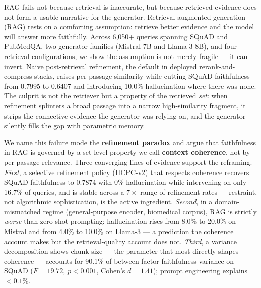 RAG fails not because retrieval is inaccurate, but because retrieved
evidence does not form a usable narrative for the generator.
Retrieval-augmented generation (RAG) rests on a comforting assumption:
retrieve better evidence and the model will answer more faithfully.
Across 6{,}050+ queries spanning SQuAD and PubMedQA, two generator
families (Mistral-7B and Llama-3-8B), and four retrieval configurations,
we show the assumption is not merely fragile — it can invert. Naive
post-retrieval refinement, the default in deployed rerank-and-compress
stacks, raises per-passage similarity while cutting SQuAD faithfulness
from 0.7995 to 0.6407 and introducing 10.0\% hallucination where there
was none. The culprit is not the retriever but a property of the
retrieved \emph{set}: when refinement splinters a broad passage into a
narrow high-similarity fragment, it strips the connective evidence the
generator was relying on, and the generator silently fills the gap with
parametric memory.

We name this failure mode the \textbf{refinement paradox} and argue that
faithfulness in RAG is governed by a set-level property we call
\textbf{context coherence}, not by per-passage relevance. Three
converging lines of evidence support the reframing. \emph{First}, a
selective refinement policy (HCPC-v2) that respects coherence recovers
SQuAD faithfulness to 0.7874 with 0\% hallucination while intervening on
only 16.7\% of queries, and is stable across a $7\times$ range of
refinement rates — restraint, not algorithmic sophistication, is the
active ingredient. \emph{Second}, in a domain-mismatched regime
(general-purpose encoder, biomedical corpus), RAG is strictly
\emph{worse} than zero-shot prompting: hallucination rises from 8.0\% to
20.0\% on Mistral and from 4.0\% to 10.0\% on Llama-3 — a prediction the
coherence account makes but the retrieval-quality account does not.
\emph{Third}, a variance decomposition shows chunk size — the parameter
that most directly shapes coherence — accounts for 90.1\% of
between-factor faithfulness variance on SQuAD ($F=19.72$, $p<0.001$,
Cohen's $d=1.41$); prompt engineering explains $<0.1\%$.


